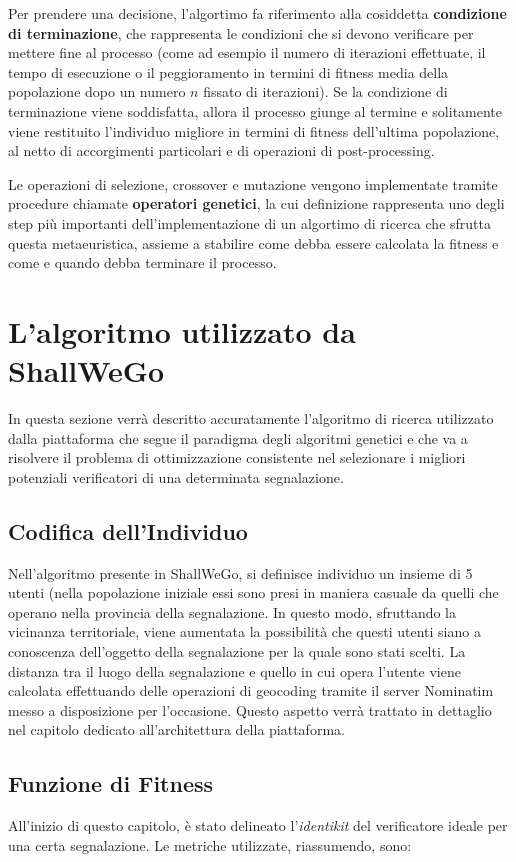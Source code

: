     Per prendere una decisione, l'algortimo fa riferimento alla cosiddetta \textbf{condizione di terminazione}, che rappresenta le condizioni che si devono verificare per mettere fine al processo (come ad esempio il numero di iterazioni effettuate, il tempo di esecuzione o il peggioramento in termini di fitness media della popolazione dopo un numero $n$ fissato di iterazioni). Se la condizione di terminazione viene soddisfatta, allora il processo giunge al termine e solitamente viene restituito l'individuo migliore in termini di fitness dell'ultima popolazione, al netto di accorgimenti particolari e di operazioni di post-processing.

    Le operazioni di selezione, crossover e mutazione vengono implementate tramite procedure chiamate \textbf{operatori genetici}, la cui definizione rappresenta uno degli step più importanti dell'implementazione di un algortimo di ricerca che sfrutta questa metaeuristica, assieme a stabilire come debba essere calcolata la fitness e come e quando debba terminare il processo. 

\section{L'algoritmo utilizzato da ShallWeGo}
    In questa sezione verrà descritto accuratamente l'algoritmo di ricerca utilizzato dalla piattaforma che segue il paradigma degli algoritmi genetici e che va a risolvere il problema di ottimizzazione consistente nel selezionare i migliori potenziali verificatori di una determinata segnalazione.

\subsection{Codifica dell'Individuo}
    Nell'algoritmo presente in ShallWeGo, si definisce individuo un insieme di 5 utenti (nella popolazione iniziale essi sono presi in maniera casuale da quelli che operano nella provincia della segnalazione. In questo modo, sfruttando la vicinanza territoriale, viene aumentata la possibilità che questi utenti siano a conoscenza dell'oggetto della segnalazione per la quale sono stati scelti. La distanza tra il luogo della segnalazione e quello in cui opera l'utente viene calcolata effettuando delle operazioni di geocoding tramite il server Nominatim messo a disposizione per l'occasione. Questo aspetto verrà trattato in dettaglio nel capitolo dedicato all'architettura della piattaforma.

\subsection{Funzione di Fitness}
    All'inizio di questo capitolo, è stato delineato l'\textit{identikit} del verificatore ideale per una certa segnalazione. Le metriche utilizzate, riassumendo, sono:

